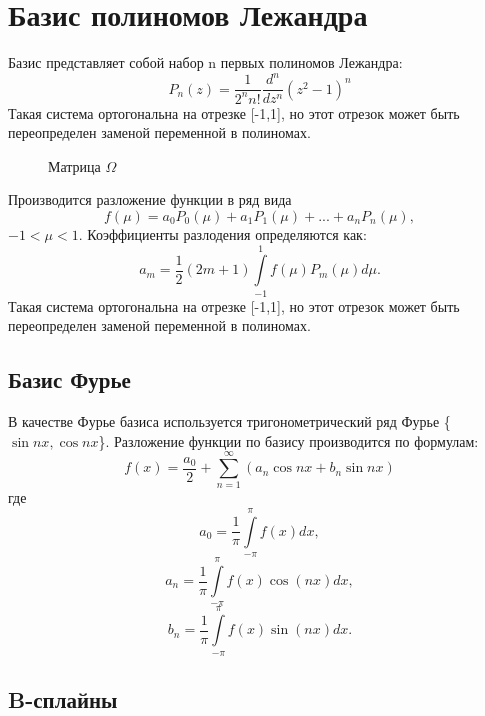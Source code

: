 \chapter{Базис полиномов Лежандра}\label{sec:legendre}

Базис представляет собой набор n первых полиномов Лежандра:
$$P_n(z)=\frac{1}{2^n n!}\frac{d^n}{dz^n}(z^2-1)^n$$
Такая система ортогональна на отрезке [-1,1], но этот отрезок может быть переопределен заменой переменной в полиномах.
\begin{figure}[h!]
	\begin{minipage}[h]{0.49\linewidth}
	\end{minipage}
\hfill
	\begin{minipage}[h]{0.49\linewidth}
		\caption{Матрица $\Omega$}
	\end{minipage}
\label{ris:image1}
\end{figure}
Производится разложение функции в ряд вида
$$f(\mu)=a_0 P_0 (\mu) + a_1 P_1 (\mu) + ... +  a_n P_n (\mu),$$
$-1 < \mu <1 .$
Коэффициенты разлодения определяются как:
$$a_m = \frac{1}{2}(2m+1)\int\limits_{-1}^{1}f(\mu)P_m (\mu)d\mu .$$
Такая система ортогональна на отрезке [-1,1], но этот отрезок может быть переопределен заменой переменной в полиномах.

\section{Базис Фурье}\label{sec:fourier}

В качестве Фурье базиса используется тригонометрический ряд Фурье \{$\sin nx, \cos nx$\}.
Разложение функции по базису производится по формулам:
$$f(x)=\frac{a_0}{2} + \sum^{\infty}_{n=1} (a_n \cos nx + b_n \sin nx)$$
где
$$a_0= \frac{1}{\pi}\int\limits_{-\pi}^{\pi}f(x)dx,$$
$$a_n= \frac{1}{\pi}\int\limits_{-\pi}^{\pi}f(x)\cos(nx)dx,$$
$$b_n= \frac{1}{\pi}\int\limits_{-\pi}^{\pi}f(x)\sin(nx)dx.$$

\section{B-сплайны}\label{sec:spline}

